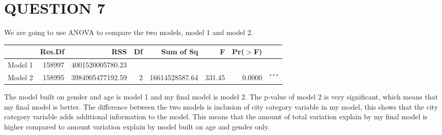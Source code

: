 \documentclass[12pt,a4paper]{article}
\begin{document}
\section*{QUESTION 7}
We are going to use ANOVA  to compare the two models, model 1 and model 2.


\begin{table}[H]
\centering
\begin{tabular}{lrrrrrrr}
  \hline
 & Res.Df & RSS & Df & Sum of Sq & F & Pr($>$F) \\ 
  \hline
Model 1 & 158997 & 4001520005780.23 &  &  &  &  \\ 
  Model 2 & 158995 & 3984905477192.59 & 2 & 16614528587.64 & 331.45 
  & 0.0000& $^{***}$ \\ 
   \hline
\end{tabular}
\end{table} The model built on gender and age is model 1 and my final model is model 2. The p-value of model 2 is very significant, which means that my final model is better. The difference between the two models is inclusion of city category variable in my model, this shows that the city category variable adds additional information to the model. This means that the amount of total variation explain by my final model is higher compared to amount variation explain by model built on age and gender only.\\
\end{document}
